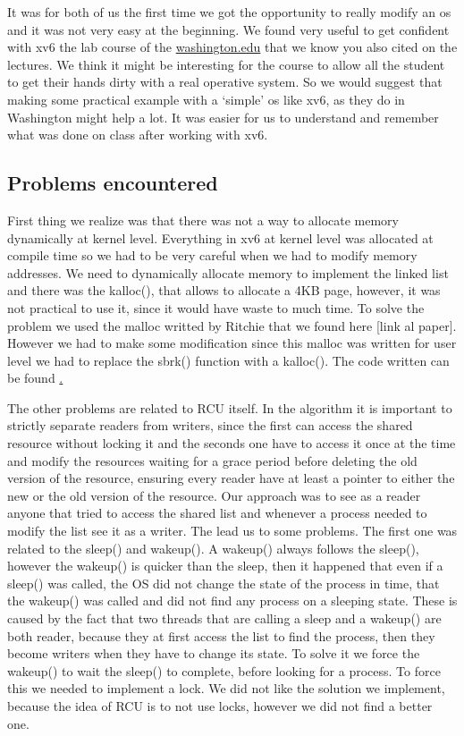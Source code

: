 \documentclass{article}
\begin{document}
It was for both of us the first time we got the opportunity to really modify an os and it was not very easy at the beginning. We found very useful to get confident with xv6 the lab course of the \href{https://courses.cs.washington.edu/courses/csep551/19au/labs/}{washington.edu} that we know you also cited on the lectures. We think it might be interesting for the course to allow all the student to get their hands dirty with a real operative system. So we would suggest that making some practical example with a ‘simple’ os like xv6, as they do in Washington might  help a lot. It was easier for us to understand and remember what was done on class after working with xv6.
\subsection{Problems encountered}

First thing we realize was that there was not a way to allocate memory dynamically at kernel level. Everything in xv6 at kernel level was allocated at compile time so we had to be very careful when we had to modify memory addresses. We need to dynamically allocate memory to implement the linked list and there was the kalloc(), that allows to allocate a 4KB page, however, it was not practical to use it, since it would have waste to much time. To solve the problem we used the malloc writted by Ritchie that we found here [link al paper]. However we had to make some modification since this malloc was written for user level we had to replace the sbrk() function with a kalloc(). The code written can be found \href{link al codice}.

The other problems are related to RCU itself. In the algorithm it is important to strictly separate readers from writers, since the first can access the shared resource without locking it and the seconds one have to access it once at the time and modify the resources waiting for a grace period before deleting the old version of the resource, ensuring every reader have at least a pointer to either the new or the old version of the resource.
Our approach was to see as a reader anyone that tried to access the shared list and whenever a process needed to modify the list see it as a writer. The lead us to some problems.
The first one was related to the sleep() and wakeup(). A wakeup() always follows the sleep(), however the wakeup() is quicker than the sleep, then it happened that even if a sleep() was called, the OS did not change the state of the process in time, that the wakeup() was called and did not find any process on a sleeping state. These is caused by the fact that two threads that are calling a sleep and a wakeup() are both reader, because they at first access the list to find the process, then they become writers when they have to change its state. To solve it we force the  wakeup() to wait the sleep()  to complete, before looking for a process. To force this we needed to implement a lock. We did not like the solution we implement, because the idea of RCU is to not use locks, however we did not find a better one.
\end{document}
